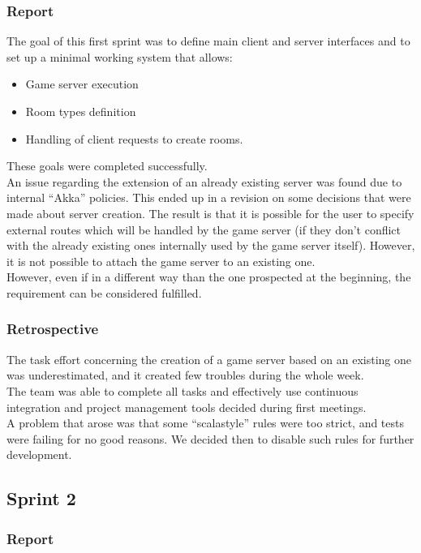 \subsubsection{Report}
The goal of this first sprint was to define main client and server interfaces and to set up a minimal working system that allows:
\begin{itemize}
	\item Game server execution 
	\item Room types definition
	\item Handling of client requests to create rooms.
\end{itemize}
These goals were completed successfully. 
\\
An issue regarding the extension of an already existing server was found due to internal ``Akka'' policies. 
This ended up in a revision on some decisions that were made about server creation. The result is that it is possible for the user to specify external routes which will be handled by the game server (if they don't conflict with the already existing ones internally used  by the game server itself). 
However, it is not possible to attach the game server to an existing one.
\\
However, even if in a different way than the one prospected at the beginning, the requirement can be considered fulfilled.   




\subsubsection{Retrospective}
The task effort concerning the creation of a game server based on an existing one was underestimated, and it created few troubles during the whole week.
\\
The team was able to complete all tasks and effectively use continuous integration and project management tools decided during first meetings.
\\
A problem that arose was that some ``scalastyle'' rules were too strict, and tests were failing for no good reasons. We decided then to disable such rules for further development.


\subsection{Sprint 2}
\subsubsection{Report}

